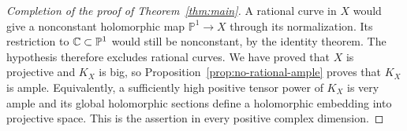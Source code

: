 \begin{proof}[Completion of the proof of Theorem~\ref{thm:main}]
A rational curve in $X$ would give a nonconstant holomorphic map
$\mathbb P^1\to X$ through its normalization.  Its restriction to
$\mathbb C\subset\mathbb P^1$ would still be nonconstant, by the identity
theorem.  The hypothesis therefore excludes rational curves.
We have proved that $X$ is projective and $K_X$ is big, so
Proposition~\ref{prop:no-rational-ample} proves that $K_X$ is ample.
Equivalently, a sufficiently high positive tensor power of $K_X$ is
very ample and its global holomorphic sections define a holomorphic
embedding into projective space.  This is the assertion in every
positive complex dimension.
\end{proof}

